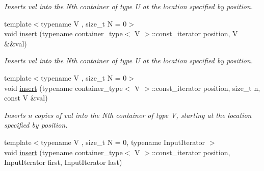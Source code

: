 \begin{DoxyCompactItemize}
\begin{DoxyCompactList}\small\item\em Inserts val into the Nth container of type U at the location specified by position. \end{DoxyCompactList}\item 
\hypertarget{classheterogeneous_1_1heterovector_3_01_t_00_01_u_00_01_types_8_8_8_4_a5179a78bba3acb8ebec1db70fefccb70}{}{\footnotesize template$<$typename V , size\+\_\+t N = 0$>$ }\\void \hyperlink{classheterogeneous_1_1heterovector_3_01_t_00_01_u_00_01_types_8_8_8_4_a5179a78bba3acb8ebec1db70fefccb70}{insert} (typename container\+\_\+type$<$ V $>$\+::const\+\_\+iterator position, V \&\&val)\label{classheterogeneous_1_1heterovector_3_01_t_00_01_u_00_01_types_8_8_8_4_a5179a78bba3acb8ebec1db70fefccb70}

\begin{DoxyCompactList}\small\item\em Inserts val into the Nth container of type U at the location specified by position. \end{DoxyCompactList}\item 
\hypertarget{classheterogeneous_1_1heterovector_3_01_t_00_01_u_00_01_types_8_8_8_4_a5ada8c5f0352f1c74a34b24af98ea57e}{}{\footnotesize template$<$typename V , size\+\_\+t N = 0$>$ }\\void \hyperlink{classheterogeneous_1_1heterovector_3_01_t_00_01_u_00_01_types_8_8_8_4_a5ada8c5f0352f1c74a34b24af98ea57e}{insert} (typename container\+\_\+type$<$ V $>$\+::const\+\_\+iterator position, size\+\_\+t n, const V \&val)\label{classheterogeneous_1_1heterovector_3_01_t_00_01_u_00_01_types_8_8_8_4_a5ada8c5f0352f1c74a34b24af98ea57e}

\begin{DoxyCompactList}\small\item\em Inserts n copies of val into the Nth container of type V, starting at the location specified by position. \end{DoxyCompactList}\item 
\hypertarget{classheterogeneous_1_1heterovector_3_01_t_00_01_u_00_01_types_8_8_8_4_a8d579442fd3dc0e53312fda6e00ab2a7}{}{\footnotesize template$<$typename V , size\+\_\+t N = 0, typename Input\+Iterator $>$ }\\void \hyperlink{classheterogeneous_1_1heterovector_3_01_t_00_01_u_00_01_types_8_8_8_4_a8d579442fd3dc0e53312fda6e00ab2a7}{insert} (typename container\+\_\+type$<$ V $>$\+::const\+\_\+iterator position, Input\+Iterator first, Input\+Iterator last)\label{classheterogeneous_1_1heterovector_3_01_t_00_01_u_00_01_types_8_8_8_4_a8d579442fd3dc0e53312fda6e00ab2a7}


\end{DoxyCompactItemize}
